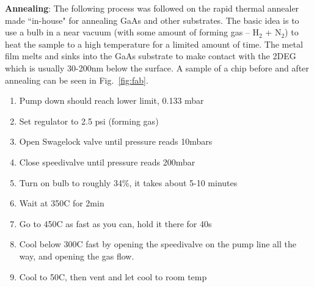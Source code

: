 \textbf{Annealing}: The following process was followed on the rapid thermal annealer made ``in-house" for annealing GaAs and other substrates. The basic idea is to use a bulb in a near vacuum (with some amount of forming gas -- H$_2$ + N$_2$) to heat the sample to a high temperature for a limited amount of time. The metal film melts and sinks into the GaAs substrate to make contact with the \ac{2DEG} which is usually 30-200nm below the surface. A sample of a chip before and after annealing can be seen in Fig.~\ref{fig:fab}.
\begin{enumerate}
	\item Pump down should reach lower limit, 0.133 mbar
	\item Set regulator to 2.5 psi (forming gas)
	\item Open Swagelock valve until pressure reads 10mbars
	\item Close speedivalve until pressure reads 200mbar
	\item Turn on bulb to roughly 34\%, it takes about 5-10 minutes
	\item Wait at 350C  for 2min
	\item Go to 450C as fast as you can, hold it there for 40s
	\item Cool below 300C fast by opening the speedivalve on the pump line all the way, and opening the gas flow. 
	\item Cool to 50C, then vent and let cool to room temp
\end{enumerate}


